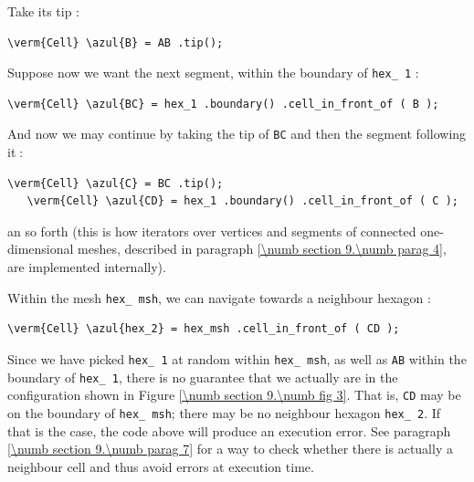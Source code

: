 Take its tip :

\begin{Verbatim}[commandchars=\\\{\},formatcom=\small\tt,
   baselinestretch=0.94,framesep=2mm                      ]
   \verm{Cell} \azul{B} = AB .tip();
\end{Verbatim}

Suppose now we want the next segment, within the boundary of {\small\tt hex\_\,1} :

\begin{Verbatim}[commandchars=\\\{\},formatcom=\small\tt,
   baselinestretch=0.94,framesep=2mm                      ]
   \verm{Cell} \azul{BC} = hex_1 .boundary() .cell_in_front_of ( B );
\end{Verbatim}

And now we may continue by taking the tip of {\small\tt BC} and then the segment
following it$\;$:

\begin{Verbatim}[commandchars=\\\{\},formatcom=\small\tt,
   baselinestretch=0.94,framesep=2mm                      ]
   \verm{Cell} \azul{C} = BC .tip();
   \verm{Cell} \azul{CD} = hex_1 .boundary() .cell_in_front_of ( C );
\end{Verbatim}

\noindent an so forth (this is how iterators over vertices and segments of connected
one-dimensional meshes, described in paragraph \ref{\numb section 9.\numb parag 4},
are implemented internally).

Within the mesh {\small\tt hex\_\,msh}, we can navigate towards a neighbour hexagon :

\begin{Verbatim}[commandchars=\\\{\},formatcom=\small\tt,
   baselinestretch=0.94,framesep=2mm                      ]
   \verm{Cell} \azul{hex_2} = hex_msh .cell_in_front_of ( CD );
\end{Verbatim}

Since we have picked {\small\tt hex\_\,1} at random within {\small\tt hex\_\,msh},
as well as {\small\tt AB} within the boundary of {\small\tt hex\_\,1},
there is no guarantee that we actually are in the configuration shown in
Figure \ref{\numb section 9.\numb fig 3}.
That is, {\small\tt CD} may be on the boundary of {\small\tt hex\_\,msh};
there may be no neighbour hexagon {\small\tt hex\_\,2}.
If that is the case, the code above will produce an execution error.
See paragraph \ref{\numb section 9.\numb parag 7} for a way to check whether there is actually
a neighbour cell and thus avoid errors at execution time.

